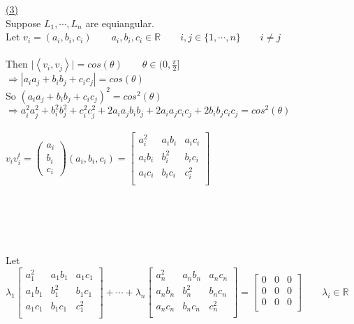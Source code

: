 \documentclass[12pt]{article}
\newcommand{\R}{\mathbb{R}}
\begin{document}
	\newpage
	\hyperlink{toc}{\hypertarget{5.3}{(3)}}\\
	Suppose $L_1, \cdots, L_n$ are equiangular.\\
	Let $v_i = (a_i, b_i, c_i) \qquad a_i, b_i, c_i \in \R \qquad i,j \in \{1, \cdots, n\} \qquad i \not = j$ \\\\
	Then $\displaystyle \big|\left\langle v_i,v_j \right\rangle \big| = cos(\theta) \qquad \theta \in \Big(0, \frac{\pi}{2} \Big]$\\
$\Longrightarrow |a_ia_j + b_ib_j + c_ic_j| = cos(\theta)$\\
	So $(a_ia_j + b_ib_j + c_ic_j)^2 = cos^2(\theta)$\\
$\Longrightarrow a_i^2 a_j^2 + b_i^2 b_j^2+ c_i^2 c_j^2 + 2a_ia_jb_ib_j + 2a_ia_jc_ic_j + 2b_ib_jc_ic_j = cos^2(\theta)$
	\\\\
$\displaystyle v_i v_i^t =  \begin{pmatrix}
	a_i \\b_i\\c_i
\end{pmatrix} (a_i, b_i, c_i)= \begin{bmatrix}
	a_i^2  & a_ib_i & a_ic_i \\
	a_ib_i & b_i^2  & b_ic_i \\
	a_ic_i & b_ic_i & c_i^2  \\
\end{bmatrix}$
	\\\\\\\\\\\\
	Let $\lambda_1 \begin{bmatrix}
	a_1^2  & a_1b_1 & a_1c_1 \\
	a_1b_1 & b_1^2  & b_1c_1 \\
	a_1c_1 & b_1c_1 & c_1^2  \\
\end{bmatrix} + \cdots + \lambda_n \begin{bmatrix}
	a_n^2  & a_nb_n & a_nc_n \\
	a_nb_n & b_n^2  & b_nc_n \\
	a_nc_n & b_nc_n & c_n^2  \\
\end{bmatrix} = \begin{bmatrix}
	0 & 0 & 0 \\
	0 & 0 & 0 \\
	0 & 0 & 0 \\
\end{bmatrix} \qquad \lambda_i \in \R$
\end{document}
